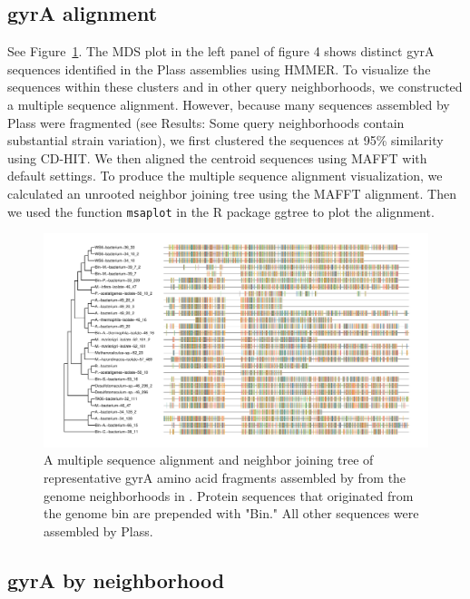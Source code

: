\subsection{gyrA alignment}
\label{subsec:gyrAalign}

See Figure~\ref{fig:gyrAalign}. The MDS plot in the left panel of figure 4 shows
distinct gyrA sequences identified in the Plass assemblies using HMMER. To visualize
the sequences within these clusters and in other query neighborhoods, we 
constructed a multiple sequence alignment. However, because many
sequences assembled by Plass were fragmented (see Results: Some query neighborhoods
contain substantial strain variation), we first clustered the sequences at 95\% 
similarity using CD-HIT. We then aligned the centroid sequences using MAFFT with 
default settings. To produce the multiple sequence alignment visualization, we 
calculated an unrooted neighbor joining tree using the MAFFT alignment. Then we used
the function {\tt msaplot} in the R package ggtree to plot the alignment.  

\begin{figure}
 \centering
 \includegraphics[width=\linewidth]{figures/gyrA-cdhit95-msa}
	\caption{A multiple sequence alignment and neighbor joining tree of representative gyrA amino acid fragments assembled by \plass from the genome neighborhoods in \hu. Protein sequences that originated from the genome bin are prepended with "Bin." All other sequences were assembled by Plass.
 }
 \label{fig:gyrAalign}
\end{figure}

\subsection{gyrA by neighborhood}
\label{subsec:gyrAnbhd}


